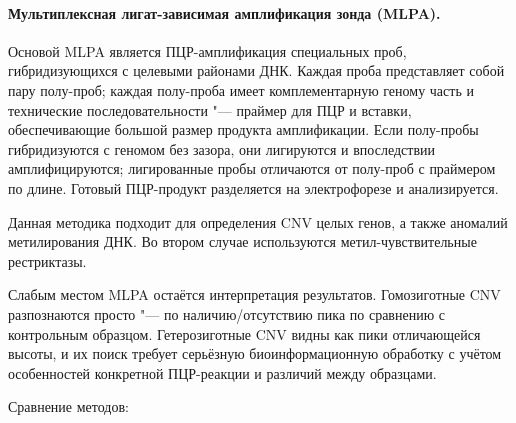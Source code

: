 \documentclass[a4paper,12pt]{article}
\begin{document}
\paragraph{Мультиплексная лигат-зависимая амплификация зонда (MLPA).}
Основой MLPA является ПЦР-амплификация специальных проб, гибридизующихся с целевыми районами ДНК.
Каждая проба представляет собой пару полу-проб;
каждая полу-проба имеет комплементарную геному часть и технические последовательности "--- праймер для ПЦР и вставки, обеспечивающие большой размер продукта амплификации.
Если полу-пробы гибридизуются с геномом без зазора, они лигируются и впоследствии амплифицируются;
лигированные пробы отличаются от полу-проб с праймером по длине.
Готовый ПЦР-продукт разделяется на электрофорезе и анализируется.

Данная методика подходит для определения CNV целых генов, а также аномалий метилирования ДНК.
Во втором случае используются метил-чувствительные рестриктазы.

Слабым местом MLPA остаётся интерпретация результатов.
Гомозиготные CNV разпознаются просто "--- по наличию/отсутствию пика по сравнению с контрольным образцом.
Гетерозиготные CNV видны как пики отличающейся высоты, и их поиск требует серьёзную биоинформационную обработку с учётом особенностей конкретной ПЦР-реакции и различий между образцами\cite{stuppia}.

Сравнение методов\cite{stuppia}:
\end{document}
